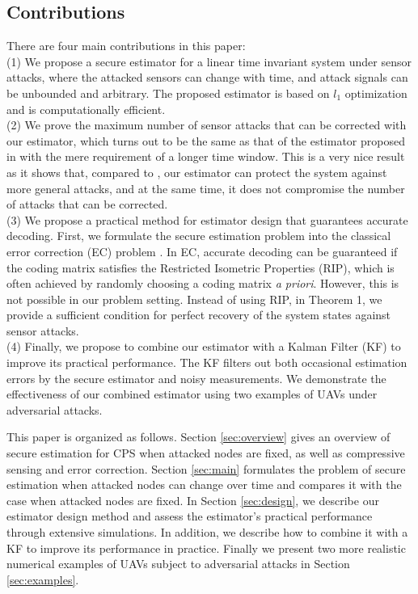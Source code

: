 \documentclass[../../thesis.tex]{subfiles}
\begin{document}

\subsection{Contributions}

There are four main contributions in this paper:\\
(1) We propose a secure estimator for a linear time invariant system under sensor attacks, where the attacked sensors can change with time, and attack signals can be unbounded and arbitrary.
The proposed estimator is based on $l_1$ optimization and is computationally efficient.\\
(2) We prove the maximum number of sensor attacks that can be corrected with our estimator, which turns out to be the same as that of the estimator proposed in \cite{Fawzi2014} with the mere requirement of a longer time window. This is a very nice result as it shows that, compared to \cite{Fawzi2014}, our estimator can protect the system against more general attacks, and at the same time, it does not compromise the number of attacks that can be corrected.\\
(3) We propose a practical method for estimator design that guarantees accurate decoding. 
First, we formulate the secure estimation problem into the classical error correction (EC) problem \cite{Candes_Tao}. In EC, accurate decoding can be guaranteed if the coding matrix satisfies the Restricted Isometric Properties (RIP), {which is often achieved by randomly choosing a coding matrix \textit{a priori}. 
However, this is not possible in our problem setting. }
Instead of using RIP, in Theorem 1, we provide a sufficient condition for perfect recovery of the system states against sensor attacks.\\
(4) 
Finally, we propose to combine our estimator with a Kalman Filter (KF) to improve its practical performance. 
The KF filters out both occasional estimation errors by the secure estimator and noisy measurements.
We demonstrate the effectiveness of our combined estimator using two examples of UAVs under adversarial attacks.

This paper is organized as follows. Section \ref{sec:overview} gives an overview of secure estimation for CPS when attacked nodes are fixed, as well as compressive sensing and error correction. Section \ref{sec:main} formulates the problem of secure estimation when attacked nodes can change over time and compares it with the case when attacked nodes are fixed. In Section \ref{sec:design}, we describe our estimator design method and assess the estimator's practical performance through extensive simulations. In addition, we describe how to combine it with a KF to improve its performance in practice. Finally we present two more realistic numerical examples of UAVs subject to adversarial attacks in Section \ref{sec:examples}. 
\end{document}
